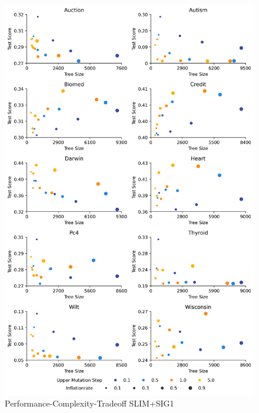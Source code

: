 
    \begin{figure}[h]
    \centering
    \includegraphics[width=\linewidth]{../Latex/Chapters/Figures/Results/inflationrate_performance_complexity_tradeoff_plussig1.png}
    \caption{Performance-Complexity-Tradeoff SLIM+SIG1}
    \label{fig:performance_complexity_tradeoff_plussig1}
    \end{figure}
    